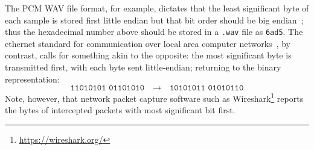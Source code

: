 The PCM WAV file format, for example, dictates that the least significant byte
of each sample is stored first \textemdash{} little endian \textemdash{} but
that bit order should be big endian~\citep{noauthor_multimedia_1991};
thus the hexadecimal number above should be stored in a \texttt{.wav} file as
\texttt{6ad5}.
The ethernet standard for communication over local area computer
networks~\citep{noauthor_ieee_2018}, by contrast, calls for something akin to
the opposite:
the most significant byte is transmitted first, with each byte sent
little-endian;
returning to the binary representation:
\begin{equation*}
    \texttt{11010101 01101010} \quad\rightarrow\quad \texttt{10101011 01010110}
\end{equation*}
Note, however, that network packet capture software such as
Wireshark\footnote{\url{https://wireshark.org/}} reports the bytes of
intercepted packets with most significant bit first.
